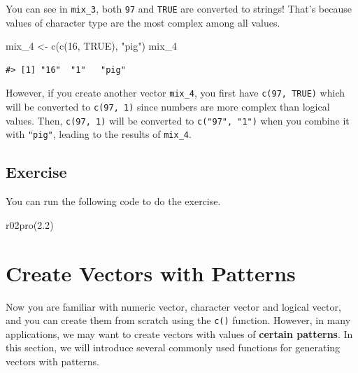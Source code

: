 \documentclass[
]{book}
\newenvironment{Shaded}{\begin{snugshade}}{\end{snugshade}}
\newcommand{\ConstantTok}[1]{\textcolor[rgb]{0.00,0.00,0.00}{#1}}
\newcommand{\DecValTok}[1]{\textcolor[rgb]{0.00,0.00,0.81}{#1}}
\newcommand{\FloatTok}[1]{\textcolor[rgb]{0.00,0.00,0.81}{#1}}
\newcommand{\FunctionTok}[1]{\textcolor[rgb]{0.00,0.00,0.00}{#1}}
\newcommand{\NormalTok}[1]{#1}
\newcommand{\OtherTok}[1]{\textcolor[rgb]{0.56,0.35,0.01}{#1}}
\newcommand{\StringTok}[1]{\textcolor[rgb]{0.31,0.60,0.02}{#1}}
\begin{document}
You can see in \texttt{mix\_3}, both \texttt{97} and \texttt{TRUE} are converted to strings! That's because values of character type are the most complex among all values.

\begin{Shaded}
\begin{Highlighting}[]
\NormalTok{mix\_4 }\OtherTok{\textless{}{-}} \FunctionTok{c}\NormalTok{(}\FunctionTok{c}\NormalTok{(}\DecValTok{16}\NormalTok{, }\ConstantTok{TRUE}\NormalTok{), }\StringTok{"pig"}\NormalTok{)}
\NormalTok{mix\_4}
\end{Highlighting}
\end{Shaded}

\begin{verbatim}
#> [1] "16"  "1"   "pig"
\end{verbatim}

However, if you create another vector \texttt{mix\_4}, you first have \texttt{c(97,\ TRUE)} which will be converted to \texttt{c(97,\ 1)} since numbers are more complex than logical values. Then, \texttt{c(97,\ 1)} will be converted to \texttt{c("97",\ "1")} when you combine it with \texttt{"pig"}, leading to the results of \texttt{mix\_4}.

\hypertarget{exercise-2}{%
\subsection{Exercise}\label{exercise-2}}

You can run the following code to do the exercise.

\begin{Shaded}
\begin{Highlighting}[]
\FunctionTok{r02pro}\NormalTok{(}\FloatTok{2.2}\NormalTok{)}
\end{Highlighting}
\end{Shaded}

\hypertarget{vector-patterns}{%
\section{Create Vectors with Patterns}\label{vector-patterns}}

Now you are familiar with numeric vector, character vector and logical vector, and you can create them from scratch using the \texttt{c()} function. However, in many applications, we may want to create vectors with values of \textbf{certain patterns}. In this section, we will introduce several commonly used functions for generating vectors with patterns.
\end{document}

